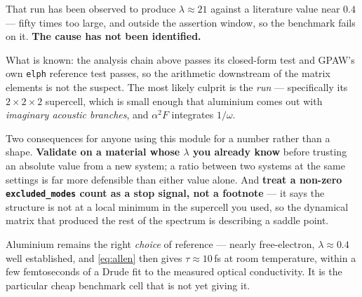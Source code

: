 \begin{calwarn}
That run has been observed to produce $\lambda \approx 21$ against a literature
value near $0.4$ --- fifty times too large, and outside the assertion window, so
the benchmark fails on it. \textbf{The cause has not been identified.}

What is known: the analysis chain above passes its closed-form test and GPAW's
own \texttt{elph} reference test passes, so the arithmetic downstream of the
matrix elements is not the suspect. The most likely culprit is the \emph{run} ---
specifically its $2\times2\times2$ supercell, which is small enough that
aluminium comes out with \emph{imaginary acoustic branches}, and $\alpha^2F$
integrates $1/\omega$.

Two consequences for anyone using this module for a number rather than a shape.
\textbf{Validate on a material whose $\lambda$ you already know} before trusting
an absolute value from a new system; a ratio between two systems at the same
settings is far more defensible than either value alone. And \textbf{treat a
non-zero \texttt{excluded\_modes} count as a stop signal, not a footnote} --- it
says the structure is not at a local minimum in the supercell you used, so the
dynamical matrix that produced the rest of the spectrum is describing a saddle
point.
\end{calwarn}

Aluminium remains the right \emph{choice} of reference --- nearly free-electron,
$\lambda \approx 0.4$ well established, and \eqref{eq:allen} then gives
$\tau \approx 10$\,fs at room temperature, within a few femtoseconds of a Drude
fit to the measured optical conductivity. It is the particular cheap benchmark
cell that is not yet giving it.
